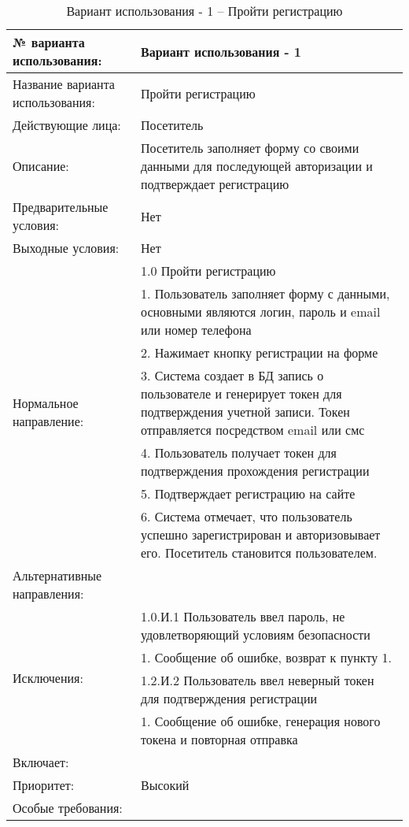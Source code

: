 \begin{table}[H]
  \caption{Вариант использования - 1 – Пройти регистрацию}\label{use-case-1-table}
  \begin{tabular}{|p{6cm}|p{10cm}|}
  \hline № варианта использования: & Вариант использования - 1 \\
  \hline Название варианта использования: & Пройти регистрацию \\
  \hline Действующие лица: & Посетитель \\
  \hline Описание: & Посетитель заполняет форму со своими данными для последующей авторизации и подтверждает регистрацию \\
  \hline Предварительные условия: & Нет \\
  \hline Выходные условия: & Нет \\
  \hline \multirow{7}{*}{Нормальное направление:} & 1.0  Пройти регистрацию \\
  \cline{2-2} & 1. Пользователь заполняет форму с данными, основными являются логин, пароль и email или номер телефона \\
  \cline{2-2} & 2. Нажимает кнопку регистрации на форме \\
  \cline{2-2} & 3. Система создает в БД запись о пользователе и генерирует токен для подтверждения учетной записи. Токен отправляется посредством email или смс \\
  \cline{2-2} & 4. Пользователь получает токен для подтверждения прохождения регистрации \\
  \cline{2-2} & 5. Подтверждает регистрацию на сайте \\
  \cline{2-2} & 6. Система отмечает, что пользователь успешно зарегистрирован и авторизовывает его. Посетитель становится пользователем. \\
  \hline Альтернативные направления: &  \\
  \hline \multirow{4}{*}{Исключения:} & 1.0.И.1 Пользователь ввел пароль, не удовлетворяющий условиям безопасности \\
  \cline{2-2} & 1. Сообщение об ошибке, возврат к пункту 1. \\
  \cline{2-2} & 1.2.И.2 Пользователь ввел неверный токен для подтверждения регистрации \\
  \cline{2-2} & 1. Сообщение об ошибке, генерация нового токена и повторная отправка \\
  \hline Включает: &  \\
  \hline Приоритет: & Высокий \\
  \hline Особые требования: &  \\
  \hline
  \end{tabular}
\end{table}

